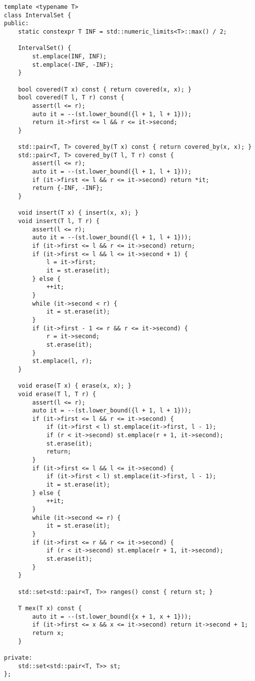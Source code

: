 \begin{lstlisting}
template <typename T>
class IntervalSet {
public:
    static constexpr T INF = std::numeric_limits<T>::max() / 2;

    IntervalSet() {
        st.emplace(INF, INF);
        st.emplace(-INF, -INF);
    }

    bool covered(T x) const { return covered(x, x); }
    bool covered(T l, T r) const {
        assert(l <= r);
        auto it = --(st.lower_bound({l + 1, l + 1}));
        return it->first <= l && r <= it->second;
    }

    std::pair<T, T> covered_by(T x) const { return covered_by(x, x); }
    std::pair<T, T> covered_by(T l, T r) const {
        assert(l <= r);
        auto it = --(st.lower_bound({l + 1, l + 1}));
        if (it->first <= l && r <= it->second) return *it;
        return {-INF, -INF};
    }

    void insert(T x) { insert(x, x); }
    void insert(T l, T r) {
        assert(l <= r);
        auto it = --(st.lower_bound({l + 1, l + 1}));
        if (it->first <= l && r <= it->second) return;
        if (it->first <= l && l <= it->second + 1) {
            l = it->first;
            it = st.erase(it);
        } else {
            ++it;
        }
        while (it->second < r) {
            it = st.erase(it);
        }
        if (it->first - 1 <= r && r <= it->second) {
            r = it->second;
            st.erase(it);
        }
        st.emplace(l, r);
    }

    void erase(T x) { erase(x, x); }
    void erase(T l, T r) {
        assert(l <= r);
        auto it = --(st.lower_bound({l + 1, l + 1}));
        if (it->first <= l && r <= it->second) {
            if (it->first < l) st.emplace(it->first, l - 1);
            if (r < it->second) st.emplace(r + 1, it->second);
            st.erase(it);
            return;
        }
        if (it->first <= l && l <= it->second) {
            if (it->first < l) st.emplace(it->first, l - 1);
            it = st.erase(it);
        } else {
            ++it;
        }
        while (it->second <= r) {
            it = st.erase(it);
        }
        if (it->first <= r && r <= it->second) {
            if (r < it->second) st.emplace(r + 1, it->second);
            st.erase(it);
        }
    }

    std::set<std::pair<T, T>> ranges() const { return st; }

    T mex(T x) const {
        auto it = --(st.lower_bound({x + 1, x + 1}));
        if (it->first <= x && x <= it->second) return it->second + 1;
        return x;
    }

private:
    std::set<std::pair<T, T>> st;
};
\end{lstlisting}